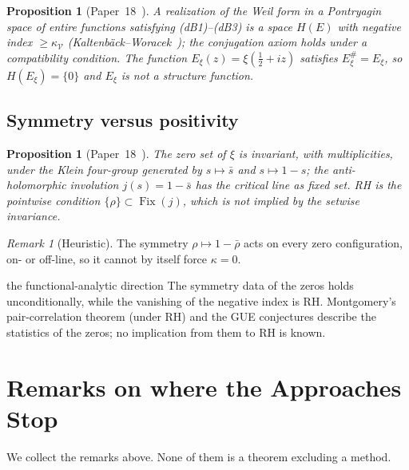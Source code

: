\documentclass[11pt]{amsart}
\newtheorem{proposition}[theorem]{Proposition}
\theoremstyle{definition}
\theoremstyle{remark}
\newtheorem{remark}[theorem]{Remark}
\newcommand{\half}{\tfrac{1}{2}}
\newcommand{\kap}{\kappa}
\newcommand{\kV}{\kappa_{\mathcal V}}
\begin{document}
\begin{proposition}[{Paper~18~\cite[Thms.~8.2, 8.4, Prop.~8.3, Rems.~6.6, 8.5]{P18}}]
\label{thm:rigidity}
A realization of the Weil form in a Pontryagin space of entire functions satisfying
\textup{(dB1)--(dB3)} is a space $H(E)$ with negative index $\ge\kV$
\textup{(}Kaltenb\"ack--Woracek~\cite{KW99}\textup{)}; the conjugation axiom holds under a
compatibility condition. The function $E_\xi(z)=\xi(\half+iz)$ satisfies
$E_\xi^\#=E_\xi$, so $H(E_\xi)=\{0\}$ and $E_\xi$ is not a structure function.
\end{proposition}

\subsection{Symmetry versus positivity}
\label{ss:sym-pos}

\begin{proposition}[{Paper~18~\cite[Thm.~9.5]{P18}}]
\label{thm:sym-pos}
The zero set of $\xi$ is invariant, with multiplicities, under the Klein four-group
generated by $s\mapsto\bar s$ and $s\mapsto1-s$; the anti-holomorphic involution
$j(s)=1-\bar s$ has the critical line as fixed set. RH is the pointwise condition
$\{\rho\}\subset\operatorname{Fix}(j)$, which is not implied by the setwise invariance.
\end{proposition}

\begin{remark}[Heuristic]
The symmetry $\rho\mapsto1-\bar\rho$ acts on every zero configuration, on- or off-line,
so it cannot by itself force $\kap=0$.
\end{remark}

\begin{wallbox}{the functional-analytic direction}
The symmetry data of the zeros holds unconditionally, while the vanishing of the negative
index is RH. Montgomery's pair-correlation theorem (under RH) and the GUE conjectures
describe the statistics of the zeros; no implication from them to RH is known.
\end{wallbox}

\section{Remarks on where the Approaches Stop}
\label{sec:nogo}

We collect the remarks above. None of them is a theorem excluding a method.
\end{document}
